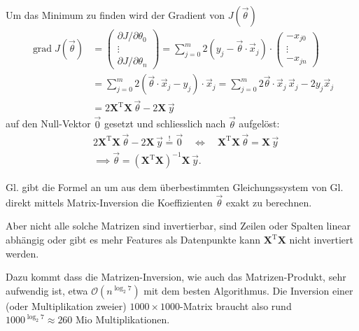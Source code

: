 Um das Minimum zu finden wird der Gradient von $J(\vec \theta)$ 
\begin{align}
    \operatorname{grad} J(\vec \theta) &=
    \begin{pmatrix} \partial J / \partial \theta_0 \\ \vdots \\ \partial J / \partial \theta_n \end{pmatrix}
    = \sum_{j = 0}^{m} 2 (y_j - \vec \theta \cdot \vec x_j) \cdot
    \begin{pmatrix} - x_{j0}\\ \vdots \\ - x_{jn} \end{pmatrix} \nonumber\\
    &= \sum_{j = 0}^{m} 2 \left( \vec \theta \cdot \vec x_j - y_j \right) \cdot \vec x_j
    = \sum_{j = 0}^{m} 2 \vec \theta \cdot \vec x_j\, \vec x_j - 2 y_j \vec x_j \nonumber\\
    &= 2 \mathbf{X}^\mathrm{T} \mathbf{X}\, \vec \theta - 2 \mathbf{X}\, \vec y
    \label{ml:regression:lstsq:grad}
\end{align}
auf den Null-Vektor $\vec 0$ gesetzt
und schliesslich nach $\vec \theta$ aufgelöst:
\begin{align}
    &2\mathbf{X}^\mathrm{T} \mathbf{X}\, \vec \theta - 2 \mathbf{X}\, \vec y \overset{!}= \vec 0 \quad\Leftrightarrow\quad
    \mathbf{X}^\mathrm{T} \mathbf{X}\, \vec \theta = \mathbf{X}\, \vec y \nonumber\\
    &\implies \vec \theta = \left( \mathbf{X}^\mathrm{T} \mathbf{X} \right)^{-1} \mathbf{X} \, \vec y.
    \label{ml:regression:lstsq:formel}
\end{align}

Gl.  gibt die Formel an um aus dem überbestimmten
Gleichungssystem von Gl.  direkt mittels Matrix-Inversion
die Koeffizienten $\vec \theta$ exakt zu berechnen.

\bigskip
Aber nicht alle solche Matrizen sind invertierbar, sind Zeilen oder Spalten linear
abhängig oder gibt es mehr Features als Datenpunkte kann $\mathbf{X}^\mathrm{T}\mathbf{X}$
nicht invertiert werden.

Dazu kommt dass die Matrizen-Inversion, wie auch das Matrizen-Produkt, sehr aufwendig ist,
etwa $\mathcal{O}(n^{\log_2 7})$ mit dem besten Algorithmus. Die Inversion  einer (oder
Multiplikation zweier) $1000 \times 1000$-Matrix braucht also rund $1000^{\log_2 7}
\approx 260$ Mio Multiplikationen.
\cite{ml:computational-complexity-math-op}

